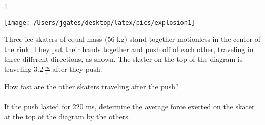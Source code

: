 
\AddToShipoutPicture*{\BackgroundPic}

\addtocounter {ProbNum} {1}

\begin{floatingfigure}[r]{.2\textwidth}
\texttt{[image: /Users/jgates/desktop/latex/pics/explosion1]}
\end{floatingfigure}
 
{\bf \Large{}} Three ice skaters of equal mass (56 kg) stand together motionless in the center of the rink.  They put their hands together and push off of each other, traveling in three different directions, as shown. The skater on the top of the diagram is traveling ${3.2~\tfrac{m}{s}}$ after they push.

\bigskip
How fast are the other skaters traveling after the push?\paragraph{}
\noindent
\vfill

If the push lasted for 220 ms, determine the average force exerted on the skater at the top of the diagram by the others.

\vfill
\newpage
